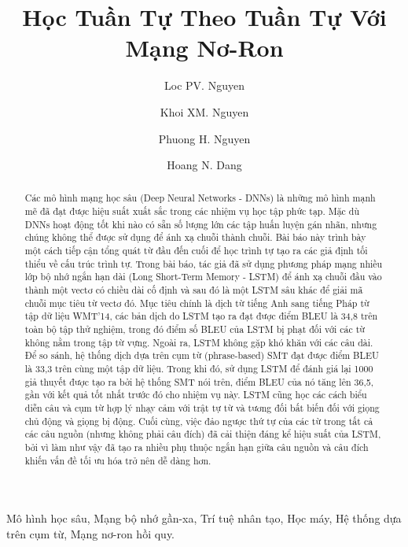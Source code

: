 \begin{frontmatter}
\title{Học Tuần Tự Theo Tuần Tự Với Mạng Nơ-Ron}
\author{Loc PV. Nguyen}
\author{Khoi XM. Nguyen}
\author{Phuong H. Nguyen}
\author{Hoang N. Dang}
\address{Faculty of Information Technology, FPT School Of Business And Technology, Ho Chi Minh city, Vietnam}

\begin{abstract}
Các mô hình mạng học sâu (Deep Neural Networks - DNNs) là những mô hình mạnh mẽ đã đạt được hiệu suất xuất sắc trong các nhiệm vụ học tập phức tạp. Mặc dù DNNs hoạt động tốt khi nào có sẵn số lượng lớn các tập huấn luyện gán nhãn, nhưng chúng không thể được sử dụng để ánh xạ chuỗi thành chuỗi. Bài báo này trình bày một cách tiếp cận tổng quát từ đầu đến cuối để học trình tự tạo ra các giả định tối thiểu về cấu trúc trình tự. Trong bài báo, tác giả đã sử dụng phương pháp mạng nhiều lớp bộ nhớ ngắn hạn dài (Long Short-Term Memory - LSTM) để ánh xạ chuỗi đầu vào thành một vectơ có chiều dài cố định và sau đó là một LSTM sâu khác để giải mã chuỗi mục tiêu từ vectơ đó. Mục tiêu chính là dịch từ tiếng Anh sang tiếng Pháp từ tập dữ liệu WMT’14, các bản dịch do LSTM tạo ra đạt được điểm BLEU là 34,8 trên toàn bộ tập thử nghiệm, trong đó điểm số BLEU của LSTM bị phạt đối với các từ không nằm trong tập từ vựng. Ngoài ra, LSTM không gặp khó khăn với các câu dài. Để so sánh, hệ thống dịch dựa trên cụm từ (phrase-based) SMT đạt được điểm BLEU là 33,3 trên cùng một tập dữ liệu. Trong khi đó, sử dụng LSTM để đánh giá lại 1000 giả thuyết được tạo ra bởi hệ thống SMT nói trên, điểm BLEU của nó tăng lên 36,5, gần với kết quả tốt nhất trước đó cho nhiệm vụ này. LSTM cũng học các cách biểu diễn câu và cụm từ hợp lý nhạy cảm với trật tự từ và tương đối bất biến đối với giọng chủ động và giọng bị động. Cuối cùng, việc đảo ngược thứ tự của các từ trong tất cả các câu nguồn (nhưng không phải câu đích) đã cải thiện đáng kể hiệu suất của LSTM, bởi vì làm như vậy đã tạo ra nhiều phụ thuộc ngắn hạn giữa câu nguồn và câu đích khiến vấn đề tối ưu hóa trở nên dễ dàng hơn.
\end{abstract}
\begin{keyword}
Mô hình học sâu, Mạng bộ nhớ gần-xa, Trí tuệ nhân tạo, Học máy, Hệ thống dựa trên cụm từ, Mạng nơ-ron hồi quy.
\end{keyword}

\end{frontmatter}
